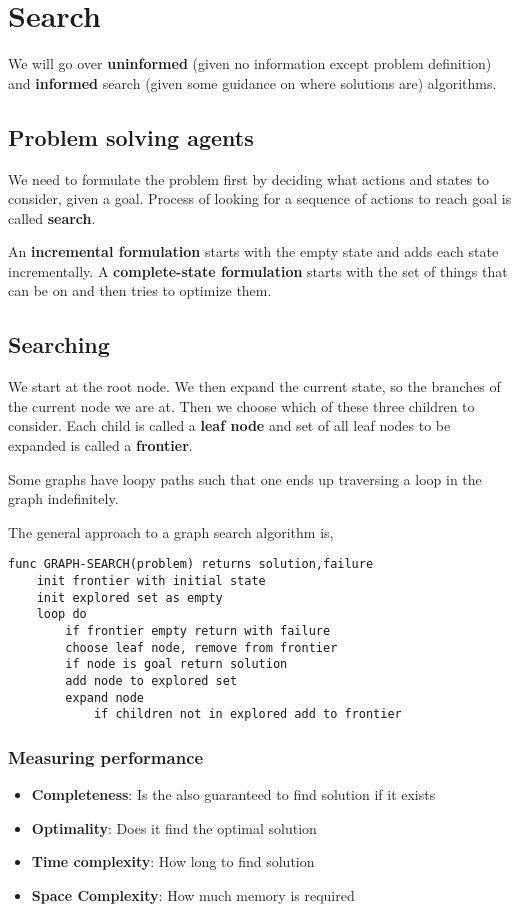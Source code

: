 \chapter{Search}
We will go over \textbf{uninformed} (given no information except problem definition) and \textbf{informed} search (given some guidance on where solutions are) algorithms. 

\section{Problem solving agents}
We need to formulate the problem first by deciding what actions and states to consider, given a goal. Process of looking for a sequence of actions to reach goal is called \textbf{search}. 

An \textbf{incremental formulation} starts with the empty state and adds each state incrementally. A \textbf{complete-state formulation}  starts with the set of things that can be on and then tries to optimize them.


\section{Searching}
We start at the root node. We then expand the current state, so the branches of the current node we are at. Then we choose which of these three children to consider. Each child is called a \textbf{leaf node}  and set of all leaf nodes to be expanded is called a \textbf{frontier}.


Some graphs have loopy paths such that one ends up traversing a loop in the graph indefinitely.

The general approach to a graph search algorithm is, 

\begin{verbatim}
func GRAPH-SEARCH(problem) returns solution,failure
    init frontier with initial state
    init explored set as empty
    loop do
        if frontier empty return with failure
        choose leaf node, remove from frontier
        if node is goal return solution
        add node to explored set
        expand node
            if children not in explored add to frontier
\end{verbatim}

\subsection{Measuring performance}
\begin{itemize}
    \item \textbf{Completeness}: Is the also guaranteed to find solution if it exists 
    \item \textbf{Optimality}: Does it find the optimal solution
    \item \textbf{Time complexity}: How long to find solution
    \item \textbf{Space Complexity}: How much memory is required
\end{itemize}

